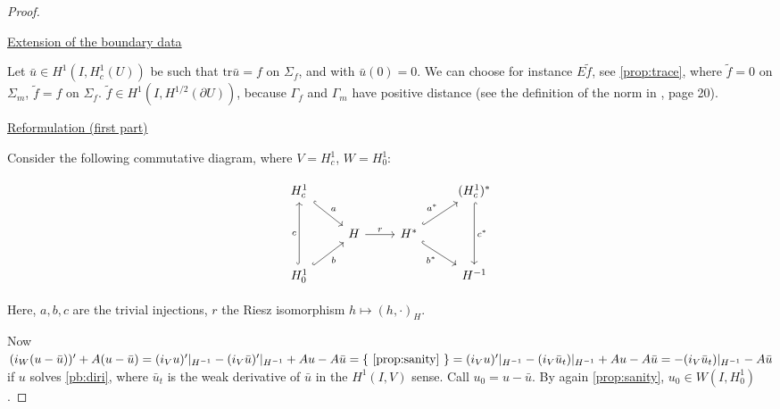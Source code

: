 \documentclass[english,a4paper,12pt,oneside]{scrbook}
\theoremstyle{break}
\newenvironment{mproof}[1][\proofname]{%
  \begin{proof}[#1]$ $\par\nobreak\ignorespaces
}{%
  \end{proof}
}
\renewcommand*{\proofname}{Proof}
\theoremstyle{remark}
\newcommand{\tr}{\text{tr}}
\newcommand{\ind}[1]{\{\text{ #1 }\}}
\begin{document}
\begin{mproof}

\underline{Extension of the boundary data}

Let $\bar{u}\in H^1(I,H^1_c(U))$ be such that $\tr \bar{u} =f$ on $\Sigma_f$, and with $\bar{u}(0)=0$. We can choose for instance $E\tilde{f}$, see \cref{prop:trace}, where $\tilde{f}=0$ on $\Sigma_m$, $\tilde{f}=f$ on $\Sigma_f$. $\tilde{f} \in H^1(I,H^{1/2}(\partial U))$, because $\Gamma_f$ and $\Gamma_m$ have positive distance (see the definition of the norm in \cite{grisvard}, page 20).  

\underline{Reformulation (first part)}

Consider the following commutative diagram, where $V = H^1_c$, $W=H^1_0$:

\[\begin{tikzcd}
	{H^1_c} &&& {(H^1_c)^*} \\
	& H & {H^*} \\
	{H^1_0} &&& {H^{-1}}
	\arrow["c", hook, from=3-1, to=1-1]
	\arrow["a", hook, from=1-1, to=2-2]
	\arrow["b"', hook, from=3-1, to=2-2]
	\arrow["{a^*}", hook, from=2-3, to=1-4]
	\arrow["r", from=2-2, to=2-3]
	\arrow["{b^*}"', hook, from=2-3, to=3-4]
	\arrow["{c^*}", hook, from=1-4, to=3-4]
\end{tikzcd}\]

Here, $a,b,c$ are the trivial injections, $r$ the Riesz isomorphism $h\mapsto(h,\cdot)_H$. 

Now $(i_W (u-\bar{u}) )'+A(u - \bar{u}) = (i_Vu)'|_{H^{-1}}-(i_V\bar{u})'|_{H^{-1}}+Au - A\bar{u} = \ind{\cref{prop:sanity}}  = (i_Vu)'|_{H^{-1}}-(i_V\bar{u}_t)|_{H^{-1}}+Au - A\bar{u} = -(i_V\bar{u}_t)|_{H^{-1}}- A\bar{u}$ if $u$ solves \cref{pb:diri}, where $\bar{u}_t$ is the weak derivative of $\bar{u}$ in the $H^1(I,V)$ sense. Call $u_0 = u-\bar{u}$. By again \cref{prop:sanity}, $u_0 \in W(I,H^1_0)$.

%
%


\end{mproof}
\end{document}

